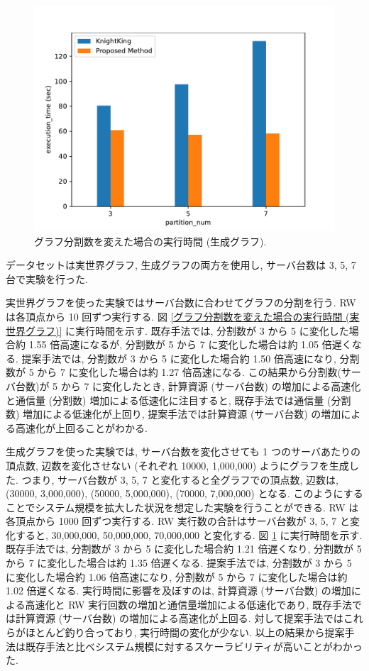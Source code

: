 \begin{figure}[t!]
    \centering
    \includegraphics[scale=0.8]{figure/Kn_vs_AR_partition_num_SBM_3.pdf}
    \caption{グラフ分割数を変えた場合の実行時間 (生成グラフ).}
    \label{グラフ分割数を変えた場合の実行時間 (生成グラフ)}
\end{figure}

データセットは実世界グラフ, 生成グラフの両方を使用し, サーバ台数は 3, 5, 7 台で実験を行った. 

実世界グラフを使った実験ではサーバ台数に合わせてグラフの分割を行う. RW は各頂点から 10 回ずつ実行する. 図 \ref{グラフ分割数を変えた場合の実行時間 (実世界グラフ)} に実行時間を示す. 既存手法では, 分割数が 3 から 5 に変化した場合約 1.55 倍高速になるが, 分割数が 5 から 7 に変化した場合は約 1.05 倍遅くなる. 提案手法では, 分割数が 3 から 5 に変化した場合約 1.50 倍高速になり, 分割数が 5 から 7 に変化した場合は約 1.27 倍高速になる. この結果から分割数(サーバ台数)が 5 から 7 に変化したとき, 計算資源 (サーバ台数) の増加による高速化と通信量 (分割数) 増加による低速化に注目すると, 既存手法では通信量 (分割数) 増加による低速化が上回り, 提案手法では計算資源 (サーバ台数) の増加による高速化が上回ることがわかる. 

生成グラフを使った実験では, サーバ台数を変化させても 1 つのサーバあたりの頂点数, 辺数を変化させない (それぞれ 10000, 1,000,000) ようにグラフを生成した. つまり, サーバ台数が 3, 5, 7 と変化すると全グラフでの頂点数, 辺数は, (30000, 3,000,000), (50000, 5,000,000), (70000, 7,000,000) となる. このようにすることでシステム規模を拡大した状況を想定した実験を行うことができる. RW は各頂点から 1000 回ずつ実行する. RW 実行数の合計はサーバ台数が 3, 5, 7 と変化すると, 30,000,000, 50,000,000, 70,000,000 と変化する. 図 \ref{グラフ分割数を変えた場合の実行時間 (生成グラフ)} に実行時間を示す. 既存手法では, 分割数が 3 から 5 に変化した場合約 1.21 倍遅くなり, 分割数が 5 から 7 に変化した場合は約 1.35 倍遅くなる. 提案手法では, 分割数が 3 から 5 に変化した場合約 1.06 倍高速になり, 分割数が 5 から 7 に変化した場合は約 1.02 倍遅くなる. 実行時間に影響を及ぼすのは, 計算資源 (サーバ台数) の増加による高速化と RW 実行回数の増加と通信量増加による低速化であり, 既存手法では計算資源 (サーバ台数) の増加による高速化が上回る. 対して提案手法ではこれらがほとんど釣り合っており, 実行時間の変化が少ない. 以上の結果から提案手法は既存手法と比べシステム規模に対するスケーラビリティが高いことがわかった. 

